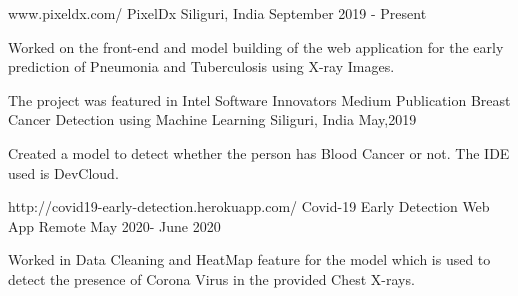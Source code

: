 \begin{cventries}
  \cventry
    {www.pixeldx.com/}
    {PixelDx}
    {Siliguri, India}
    {September 2019 - Present}
    {
      \begin{cvitems}
	    \item {Worked on the front-end and model building of the web application for the early prediction of Pneumonia and Tuberculosis using X-ray Images. }
      \end{cvitems}
    }
    \cventry
    {The project was featured in Intel Software Innovators Medium Publication}
    {Breast Cancer Detection using Machine Learning}
    {Siliguri, India}
    {May,2019}
    {
      \begin{cvitems}
        \item {Created a model to detect whether the person has Blood Cancer or not. The IDE used is DevCloud.}
      \end{cvitems}
    }
  \cventry
    {http://covid19-early-detection.herokuapp.com/}
    {Covid-19 Early Detection Web App}
    {Remote}
    {May 2020- June 2020}
    {
     \begin{cvitems}
        \item{Worked in Data Cleaning and HeatMap feature for the model which is used to detect the presence of Corona Virus in the provided Chest X-rays.}
        \end{cvitems}
        }
        \end{cventries}
        